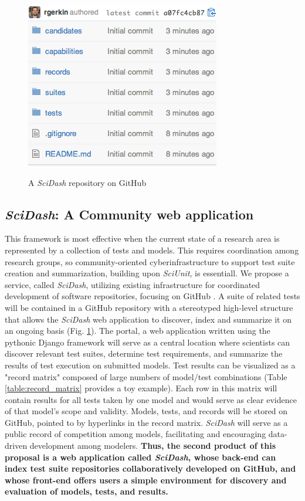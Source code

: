 \documentclass[11pt,letterpaper]{article}
\begin{document}
\begin{figure}
\centering
\includegraphics[scale=0.7]{scidash_github.png}
\label{fig:scidash_repo}
\caption{A \textit{SciDash} repository on GitHub}
\end{figure}
\leavevmode
{}    

\subsection{\textit{SciDash}: A Community web application}
This framework is most effective when the current state of a research area is represented by a collection of tests and models. This requires coordination among research groups, so community-oriented cyberinfrastructure to support test suite creation and summarization, building upon \textit{SciUnit}, is essentiall. We propose a service, called \textit{SciDash}, utilizing existing infrastructure for coordinated development of software repositories, focusing on GitHub \cite{github_url} \cite{ram_git_2013}. A suite of related tests will be contained in a GitHub repository with a stereotyped high-level structure that allows the \textit{SciDash} web application to discover, index and summarize it on an ongoing basis (Fig. \ref{fig:scidash_repo}). The portal, a web application written using the pythonic Django framework \cite{django_url} will serve as a central location where scientists can discover relevant test suites, determine test requirements, and summarize the results of test execution on submitted models. Test results can be visualized as a "record matrix" composed of large numbers of model/test combinations (Table \ref{table:record_matrix} provides a toy example).  Each row in this matrix will contain results for all tests taken by one model and would serve as clear evidence of that model's scope and validity.  Models, tests, and records will be stored on GitHub, pointed to by hyperlinks in the record matrix. \textit{SciDash} will serve as a public record of competition among models, facilitating and encouraging data-driven development among modelers. \textbf{Thus, the second product of this proposal is a web application called \textit{SciDash}, whose back-end can index test suite repositories collaboratively developed on GitHub, and whose front-end offers users a simple environment for discovery and evaluation of models, tests, and results.}  
\end{document}
